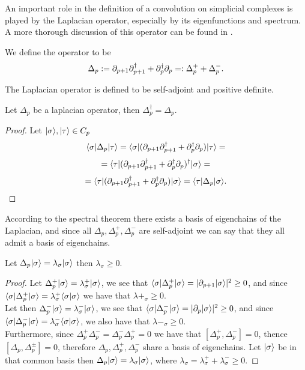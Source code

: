 \documentclass[../1.tex]{subfiles}
\begin{document}
    \label{app:C}
    An important role in the definition of a convolution on simplicial complexes is played by the Laplacian operator,
    especially by its eigenfunctions and spectrum. A more thorough discussion of this operator can be found in \cite{laplacian}.
    
    \begin{defn}
        We define the  operator to be 
        \[ \Delta_p := \partial_{p+1}\partial^\dagger_{p+1} + \partial^\dagger_p\partial_p =: \Delta^+_p + \Delta^-_p.\]
    \end{defn}

    The Laplacian operator is defined to be self-adjoint and positive definite.

    \begin{prop}
        Let $\Delta_p$ be a laplacian operator, then $\Delta^\dagger_p = \Delta_p.$
    \end{prop}
    \begin{proof}
        Let $| \sigma \rangle, | \tau \rangle \in C_p$ 
        \[ \langle \sigma |\Delta_p| \tau \rangle=\langle \sigma |(\partial_{p+1}\partial^\dagger_{p+1} + \partial^\dagger_p\partial_p)| \tau \rangle = \]
        \[ = \langle \tau |(\partial_{p+1}\partial^\dagger_{p+1} + \partial^\dagger_p\partial_p)^\dagger| \sigma \rangle = \]
        \[ = \langle \tau |(\partial_{p+1}\partial^\dagger_{p+1} + \partial^\dagger_p\partial_p)| \sigma \rangle = \langle \tau |\Delta_p| \sigma \rangle. \qedhere \]
    \end{proof}

    According to the spectral theorem there exists a basis of eigenchains of the Laplacian, and since all $\Delta_p, \Delta^+_p, \Delta^-_p$
    are self-adjoint we can say that they all admit a basis of eigenchains.

    \begin{prop}
        Let $\Delta_p| \sigma \rangle = \lambda_\sigma| \sigma \rangle$ then $\lambda_\sigma \geq 0$.
    \end{prop}
    \begin{proof}
        Let $\Delta^+_p| \sigma \rangle = \lambda^+_\sigma | \sigma \rangle$, we see that $\langle \sigma |\Delta^+_p| \sigma \rangle = | \partial_{p+1}| \sigma \rangle |^2 \geq 0$, and since
        $\langle \sigma |\Delta^+_p| \sigma \rangle = \lambda^+_\sigma\langle \sigma | \sigma \rangle$ we have that $\lambda+_\sigma \geq 0.$\\
        Let then $\Delta^-_p| \sigma \rangle = \lambda^-_\sigma | \sigma \rangle$, we see that $\langle \sigma |\Delta^-_p| \sigma \rangle = | \partial_p | \sigma \rangle |^2 \geq 0$, and since
        $\langle \sigma |\Delta^-_p| \sigma \rangle = \lambda^-_\sigma\langle \sigma | \sigma \rangle$, we also have that $\lambda-_\sigma \geq 0.$\\
        Furthermore, since $\Delta^+_p\Delta^-_p = \Delta^-_p\Delta^+_p = 0$ we have that $[\Delta^+_p,\Delta^-_p] = 0$, thence
        $[\Delta_p, \Delta^\pm_p] = 0$, therefore $\Delta_p, \Delta^+_p, \Delta^-_p$ share a basis of eigenchains.
        Let $| \sigma \rangle$ be in that common basis then $\Delta_p| \sigma \rangle = \lambda_\sigma| \sigma \rangle$, where
        $\lambda_\sigma = \lambda^+_\sigma + \lambda^-_\sigma \geq 0$. \qedhere
    \end{proof}
\end{document}
